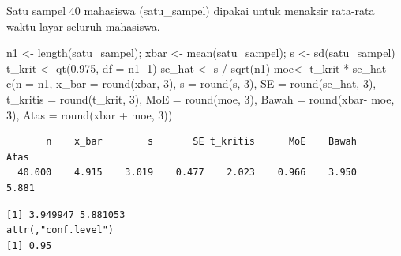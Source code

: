 \documentclass[
  indonesian,
  letterpaper,
]{book}
\newenvironment{Shaded}{\begin{snugshade}}{\end{snugshade}}
\newcommand{\AttributeTok}[1]{\textcolor[rgb]{0.40,0.45,0.13}{#1}}
\newcommand{\CommentTok}[1]{\textcolor[rgb]{0.37,0.37,0.37}{#1}}
\newcommand{\DecValTok}[1]{\textcolor[rgb]{0.68,0.00,0.00}{#1}}
\newcommand{\FloatTok}[1]{\textcolor[rgb]{0.68,0.00,0.00}{#1}}
\newcommand{\FunctionTok}[1]{\textcolor[rgb]{0.28,0.35,0.67}{#1}}
\newcommand{\NormalTok}[1]{\textcolor[rgb]{0.00,0.23,0.31}{#1}}
\newcommand{\OtherTok}[1]{\textcolor[rgb]{0.00,0.23,0.31}{#1}}
\newcommand{\SpecialCharTok}[1]{\textcolor[rgb]{0.37,0.37,0.37}{#1}}
\begin{document}
Satu sampel 40 mahasiswa (satu\_sampel) dipakai untuk menaksir rata-rata
waktu layar seluruh mahasiswa.

\begin{Shaded}
\begin{Highlighting}[]
\NormalTok{n1 }\OtherTok{\textless{}{-}} \FunctionTok{length}\NormalTok{(satu\_sampel); xbar }\OtherTok{\textless{}{-}} \FunctionTok{mean}\NormalTok{(satu\_sampel); s }\OtherTok{\textless{}{-}} \FunctionTok{sd}\NormalTok{(satu\_sampel)}
\NormalTok{t\_krit }\OtherTok{\textless{}{-}} \FunctionTok{qt}\NormalTok{(}\FloatTok{0.975}\NormalTok{, }\AttributeTok{df =}\NormalTok{ n1}\SpecialCharTok{{-}} \DecValTok{1}\NormalTok{)}
\NormalTok{se\_hat }\OtherTok{\textless{}{-}}\NormalTok{ s }\SpecialCharTok{/} \FunctionTok{sqrt}\NormalTok{(n1)}
\NormalTok{moe}\OtherTok{\textless{}{-}}\NormalTok{ t\_krit }\SpecialCharTok{*}\NormalTok{ se\_hat}
\FunctionTok{c}\NormalTok{(}\AttributeTok{n =}\NormalTok{ n1, }\AttributeTok{x\_bar =} \FunctionTok{round}\NormalTok{(xbar, }\DecValTok{3}\NormalTok{), }\AttributeTok{s =} \FunctionTok{round}\NormalTok{(s, }\DecValTok{3}\NormalTok{), }\AttributeTok{SE =} \FunctionTok{round}\NormalTok{(se\_hat, }\DecValTok{3}\NormalTok{),}
\AttributeTok{t\_kritis =} \FunctionTok{round}\NormalTok{(t\_krit, }\DecValTok{3}\NormalTok{), }\AttributeTok{MoE =} \FunctionTok{round}\NormalTok{(moe, }\DecValTok{3}\NormalTok{),}
\AttributeTok{Bawah =} \FunctionTok{round}\NormalTok{(xbar}\SpecialCharTok{{-}}\NormalTok{ moe, }\DecValTok{3}\NormalTok{), }\AttributeTok{Atas =} \FunctionTok{round}\NormalTok{(xbar }\SpecialCharTok{+}\NormalTok{ moe, }\DecValTok{3}\NormalTok{))}
\end{Highlighting}
\end{Shaded}

\begin{verbatim}
       n    x_bar        s       SE t_kritis      MoE    Bawah     Atas 
  40.000    4.915    3.019    0.477    2.023    0.966    3.950    5.881 
\end{verbatim}

\begin{Shaded}
\end{Shaded}

\begin{verbatim}
[1] 3.949947 5.881053
attr(,"conf.level")
[1] 0.95
\end{verbatim}
\end{document}
